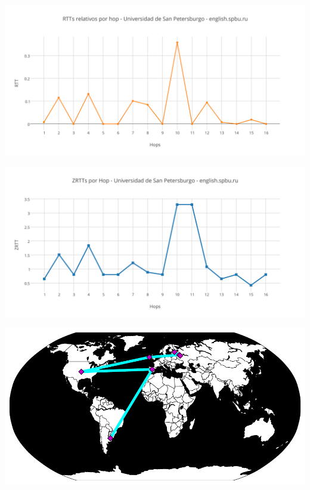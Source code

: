 \includegraphics[scale=0.65]{imagenes/rusia/RTTs.png} 

\includegraphics[scale=0.65]{imagenes/rusia/ZRTTs.png} 

\begin{center}
\includegraphics[scale=0.8]{imagenes/rusia/rusia.pdf} 
\end{center}
